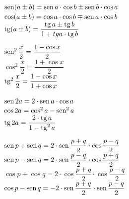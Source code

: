 \begin{tcolorbox}[colback=white,colframe=minha_cor,coltitle=black,title=Soma de diferença de arcos] 
\begin{center}
    \begin{minipage}{6.5cm}
    $\operatorname{sen} (a \pm b) = \operatorname{sen} a \cdot \cos b \pm \operatorname{sen} b \cdot \cos a$ \\[0.25cm]
    $\cos (a \pm b) = \cos a \cdot \cos b \mp \operatorname{sen} a \cdot \cos b$ \\[0.25cm]
    $\operatorname{tg} (a \pm b) = \dfrac{\operatorname{tg} a \pm \operatorname{tg} b}{1 + tg a \cdot \operatorname{tg} b}$ \\
    \end{minipage}
\end{center}
\end{tcolorbox}

\begin{tcolorbox}[colback=white,colframe=minha_cor,coltitle=black,title=Divisão de arcos] 
\begin{center}
    \begin{minipage}{6.5cm}
    $\operatorname{sen}^2 \dfrac{x}{2} = \dfrac{1- \cos x}{2}$ \\[0.25cm]
    $\cos^2 \dfrac{x}{2} = \dfrac{1+ \cos x}{2}$ \\[0.25cm]
    $\operatorname{tg}^2 \dfrac{x}{2} = \dfrac{1- \cos x}{1+ \cos x}$ \\
    \end{minipage}
\end{center}
\end{tcolorbox}

\begin{tcolorbox}[colback=white,colframe=minha_cor,coltitle=black,title=Multiplicação de arcos] 
\begin{center}
    \begin{minipage}{6.5cm}
    $\operatorname{sen} 2a = 2 \cdot \operatorname{sen} a \cdot \cos a$ \\[0.25cm]
    $\cos 2a = \cos^2 a - \operatorname{sen}^2 a$ \\[0.25cm]
    $\operatorname{tg} 2a = \dfrac{2 \cdot \operatorname{tg} a}{1- \operatorname{tg}^2 a}$ \\
    \end{minipage}
\end{center}
\end{tcolorbox}

\begin{tcolorbox}[colback=white,colframe=minha_cor,coltitle=black,title=Transformação em produtos] 
\begin{center}
    \begin{minipage}{7cm}
    $\operatorname{sen} p + \operatorname{sen} q = 2 \cdot \operatorname{sen} \dfrac{p + q}{2} \cdot \cos \dfrac{p - q}{2}$ \\[0.25cm]
    $\operatorname{sen} p - \operatorname{sen} q = 2 \cdot \operatorname{sen} \dfrac{p - q}{2} \cdot \cos \dfrac{p + q}{2}$ \\[0.25cm]
    $\cos p + \cos q = 2 \cdot \cos \dfrac{p + q}{2} \cdot \cos \dfrac{p - q}{2}$ \\[0.25cm]
     $\cos p - \operatorname{sen} q = -2 \cdot \operatorname{sen} \dfrac{p + q}{2} \cdot \operatorname{sen} \dfrac{p - q}{2}$ \\
    \end{minipage}
\end{center}
\end{tcolorbox}

